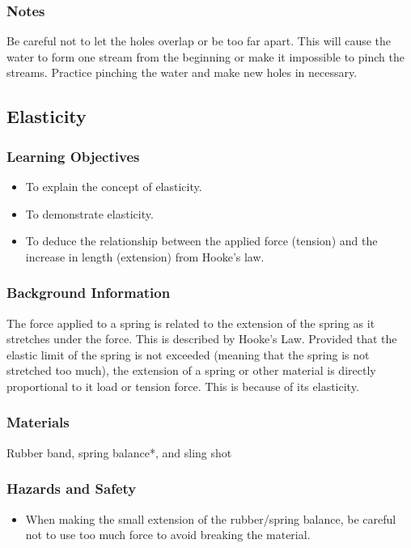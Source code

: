 \subsubsection*{Notes}
Be careful not to let the holes overlap or be too far apart.  This will cause the water to form one stream from the beginning or make it impossible to pinch the streams.  Practice pinching the water and make new holes in necessary.

\subsection{Elasticity}

\subsubsection*{Learning Objectives}
\begin{itemize}
\item{To explain the concept of elasticity.} 
\item{To demonstrate elasticity.} 
\item{To deduce the relationship between the applied force (tension) and the increase in length (extension) from Hooke's law.} 
\end{itemize}

\subsubsection*{Background Information}
The force applied to a spring is related to the extension of the spring as it stretches under the force.  This is described by Hooke's Law.  Provided that the elastic limit of the spring is not exceeded (meaning that the spring is not stretched too much), the extension of a spring or other material is directly proportional to it load or tension force.  This is because of its elasticity.

\subsubsection*{Materials}
Rubber band, spring balance*, and sling shot

\subsubsection*{Hazards and Safety}
\begin{itemize}
\item{When making the small extension of the rubber/spring balance, be careful not to use too much force to avoid breaking the material.} 
\end{itemize}

